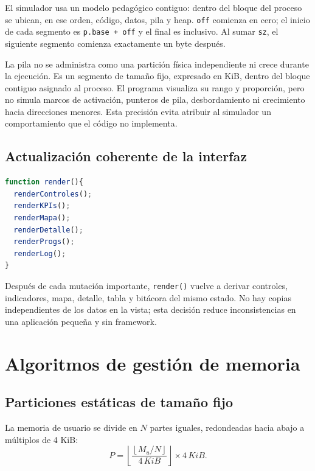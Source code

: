 \documentclass[11pt,a4paper]{article}
\newcommand{\funcion}[1]{\texttt{#1()}}
\begin{document}
El simulador usa un modelo pedagógico contiguo: dentro del bloque del proceso se
ubican, en ese orden, código, datos, pila y heap. \texttt{off} comienza en cero;
el inicio de cada segmento es \texttt{p.base + off} y el final es inclusivo. Al
sumar \texttt{sz}, el siguiente segmento comienza exactamente un byte después.

\begin{nota}
La pila no se administra como una partición física independiente ni crece durante
la ejecución. Es un segmento de tamaño fijo, expresado en KiB, dentro del bloque
contiguo asignado al proceso. El programa visualiza su rango y proporción, pero no
simula marcos de activación, punteros de pila, desbordamiento ni crecimiento hacia
direcciones menores. Esta precisión evita atribuir al simulador un comportamiento
que el código no implementa.
\end{nota}

\subsection{Actualización coherente de la interfaz}

\begin{lstlisting}[language=JavaScript,caption={Punto central de renderizado.}]
function render(){
  renderControles();
  renderKPIs();
  renderMapa();
  renderDetalle();
  renderProgs();
  renderLog();
}
\end{lstlisting}

Después de cada mutación importante, \funcion{render} vuelve a derivar controles,
indicadores, mapa, detalle, tabla y bitácora del mismo estado. No hay copias
independientes de los datos en la vista; esta decisión reduce inconsistencias en
una aplicación pequeña y sin framework.

\section{Algoritmos de gestión de memoria}

\subsection{Particiones estáticas de tamaño fijo}

La memoria de usuario se divide en \(N\) partes iguales, redondeadas hacia abajo a
múltiplos de 4 KiB:
\[
  P=\left\lfloor\frac{\left\lfloor M_u/N\right\rfloor}{4\,KiB}\right\rfloor
  \times 4\,KiB.
\]
\end{document}
